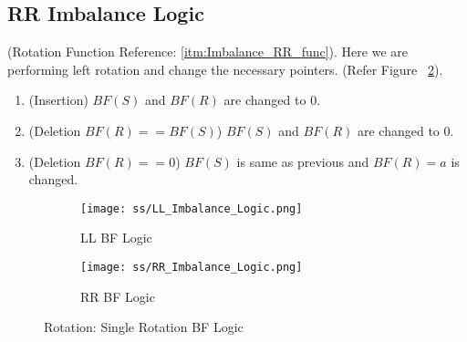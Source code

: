 \documentclass{article}
\begin{document}
\subsection{RR Imbalance Logic}
\label{RR_Imb_op_logic}
(Rotation Function Reference: \ref{itm:Imbalance_RR_func}). \newline
Here we are performing left rotation and change the necessary pointers.
(Refer Figure ~\ref{fig:RR_Imbalance_Logic}).
\begin{enumerate}
    \item (Insertion) $BF(S)$ and $BF(R)$ are changed to $0$.
    \item (Deletion $BF(R) == BF(S)$) $BF(S)$ and $BF(R)$ are changed to $0$.
    \item (Deletion $BF(R) == 0$) $BF(S)$ is same as previous and $BF(R) = a$ is changed.
\end{enumerate}
        \begin{figure}[H]
            \begin{subfigure}{0.5\textwidth}
                \centering
                \texttt{[image: ss/LL\_Imbalance\_Logic.png]}
                \caption{LL BF Logic}
                \label{fig:LL_Imbalance_Logic}
            \end{subfigure}
            \begin{subfigure}{0.5\textwidth}
                \centering
                \texttt{[image: ss/RR\_Imbalance\_Logic.png]}
                \caption{RR BF Logic}
                \label{fig:RR_Imbalance_Logic}
            \end{subfigure}
            \caption{Rotation: Single Rotation BF Logic}
        \label{fig:single_rotations}
        \end{figure}  
    
\end{document}
